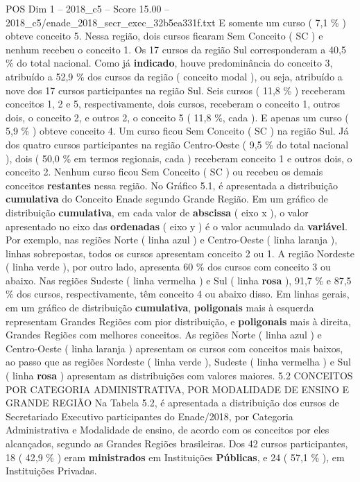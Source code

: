 \begin{textsample}{POS Dim 1 – 2018\_c5 – Score 15.00 – 2018\_c5/enade\_2018\_secr\_exec\_32b5ea331f.txt}
E somente um curso ( 7,1 \% ) obteve conceito 5.
Nessa região, dois cursos ficaram Sem Conceito ( SC ) e nenhum recebeu o conceito 1.
Os 17 cursos da região Sul corresponderam a 40,5 \% do total nacional.
Como já \textbf{indicado}, houve predominância do conceito 3, atribuído a 52,9 \% dos cursos da região ( conceito modal ), ou seja, atribuído a nove dos 17 cursos participantes na região Sul.
Seis cursos ( 11,8 \% ) receberam conceitos 1, 2 e 5, respectivamente, dois cursos, receberam o conceito 1, outros dois, o conceito 2, e outros 2, o conceito 5 ( 11,8 \%, cada ).
E apenas um curso ( 5,9 \% ) obteve conceito 4.
Um curso ficou Sem Conceito ( SC ) na região Sul.
Já dos quatro cursos participantes na região Centro-Oeste ( 9,5 \% do total nacional ), dois ( 50,0 \% em termos regionais, cada ) receberam conceito 1 e outros dois, o conceito 2.
Nenhum curso ficou Sem Conceito ( SC ) ou recebeu os demais conceitos \textbf{restantes} nessa região.
No Gráfico 5.1, é apresentada a distribuição \textbf{cumulativa} do Conceito Enade segundo Grande Região.
Em um gráfico de distribuição \textbf{cumulativa}, em cada valor de \textbf{abscissa} ( eixo x ), o valor apresentado no eixo das \textbf{ordenadas} ( eixo y ) é o valor acumulado da \textbf{variável}.
Por exemplo, nas regiões Norte ( linha azul ) e Centro-Oeste ( linha laranja ), linhas sobrepostas, todos os cursos apresentam conceito 2 ou 1.
A região Nordeste ( linha verde ), por outro lado, apresenta 60 \% dos cursos com conceito 3 ou abaixo.
Nas regiões Sudeste ( linha vermelha ) e Sul ( linha \textbf{rosa} ), 91,7 \% e 87,5 \% dos cursos, respectivamente, têm conceito 4 ou abaixo disso.
Em linhas gerais, em um gráfico de distribuição \textbf{cumulativa}, \textbf{poligonais} mais à esquerda representam Grandes Regiões com pior distribuição, e \textbf{poligonais} mais à direita, Grandes Regiões com melhores conceitos.
As regiões Norte ( linha azul ) e Centro-Oeste ( linha laranja ) apresentam os cursos com conceitos mais baixos, ao passo que as regiões Nordeste ( linha verde ), Sudeste ( linha vermelha ) e Sul ( linha \textbf{rosa} ) apresentam as distribuições com valores maiores. 5.2 CONCEITOS POR CATEGORIA ADMINISTRATIVA, POR MODALIDADE DE ENSINO E GRANDE REGIÃO Na Tabela 5.2, é apresentada a distribuição dos cursos de Secretariado Executivo participantes do Enade/2018, por Categoria Administrativa e Modalidade de ensino, de acordo com os conceitos por eles alcançados, segundo as Grandes Regiões brasileiras.
Dos 42 cursos participantes, 18 ( 42,9 \% ) eram \textbf{ministrados} em Instituições \textbf{Públicas}, e 24 ( 57,1 \% ), em Instituições Privadas.

\end{textsample}

